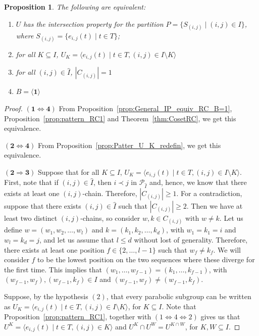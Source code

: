 \documentclass[11pt,letterpaper]{amsart}
\newtheorem{proposition}[theorem]{Proposition}
\newcommand{\PP}{\mathcal{P}}
\begin{document}
\begin{proposition}\label{prop:Pattern_B=1equiv}
The following are equivalent:
    \begin{enumerate}
        \item $U$ has the intersection property for the partition $P=\{S_{(i,j)}\mid (i,j)\in I\}$, where $S_{(i,j)} = \{e_{i,j}(t)\mid t\in T\}$;
        \item for all $K\subseteq I$, $U_K = \langle e_{i,j}(t)\mid t\in T, (i,j)\in I\setminus K\rangle$
        \item for all $(i,j)\in \widehat{I}$, $|C_{(i,j)}| = 1$
        \item $B = \langle\mathbf{1}\rangle$
    \end{enumerate}
\end{proposition}
\begin{proof}
    $\mathbf{(1\Leftrightarrow4)}$
    From Proposition~\ref{prop:General_IP_equiv_RC_B=1}, Proposition~\ref{prop:pattern_RC1} and Theorem~\ref{thm:CosetRC}, we get this equivalence. 
    
    $\mathbf{(2\Leftrightarrow4)}$ From Proposition~\ref{prop:Patter_U_K_redefin}, we get this equivalence.

    $\mathbf{(2\Rightarrow 3)}$
    Suppose that for all $K\subseteq I$, $U_K = \langle e_{i,j}(t)\mid t\in T, (i,j)\in I\setminus K\rangle$. First, note that if $(i,j)\in \widehat{I}$, then $i\prec j$ in $\PP_{\widehat{I}}$ and, hence, we know that there exists at least one $(i,j)$-chain. Therefore, $|C_{(i,j)}| \geq 1$. For a contradiction, suppose that there exists $(i,j)\in \widehat{I}$ such that $|C_{(i,j)}|\geq 2$. Then we have at least two distinct $(i,j)$-chains, so consider $w,k\in  C_{(i,j)}$ with $w\neq k$. Let us define $w=(w_1,w_2,\ldots,w_l)$ and $k=(k_1,k_2,\ldots,k_d)$, with $w_1=k_1=i$ and $w_l=k_d=j$, and let us assume that $l\leq d$ without lost of generality.
    Therefore, there exists at least one position $f\in \{2,\ldots,l-1\}$ such that $w_f\neq k_f$. We will consider $f$ to be the lowest position on the two sequences where these diverge for the first time. This implies that $(w_1,\ldots,w_{f-1})=(k_1,\ldots,k_{f-1})$, with $(w_{f-1},w_f), (w_{f-1},k_f)\in I$ and $(w_{f-1},w_f)\neq (w_{f-1},k_f)$.
    
    Suppose, by the hypothesis $(2)$, that every parabolic subgroup can be written as $U_K = \langle e_{i,j}(t)\mid t\in T, (i,j)\in I\setminus K\rangle$, for $K\subseteq I$.
    Note that Proposition~\ref{prop:pattern_RC1}, together with $(1\Leftrightarrow 4 \Leftrightarrow 2)$ gives us that $U^K =\langle e_{i,j}(t)\mid t\in T, (i,j)\in K \rangle$ and $ U^K\cap U^W = U^{K\cap W}$, for $K,W\subseteq I$.
    

\end{proof}
\end{document}

